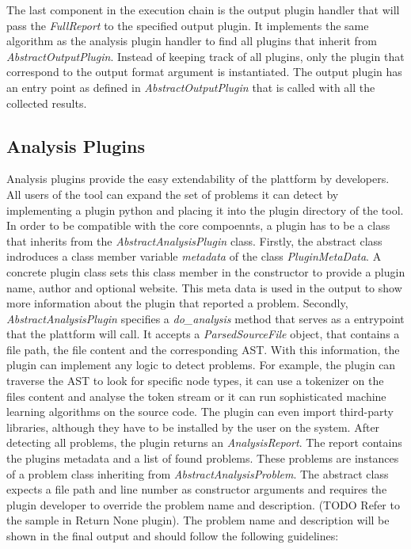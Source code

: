 The last component in the execution chain is the output plugin handler that will pass the \textit{FullReport} to the specified output plugin. It implements the same algorithm as the analysis plugin handler to find all plugins that inherit from \textit{AbstractOutputPlugin}. Instead of keeping track of all plugins, only the plugin that correspond to the output format argument is instantiated. The output plugin has an entry point as defined in \textit{AbstractOutputPlugin}  that is called with all the collected results.

\subsection{Analysis Plugins}
Analysis plugins provide the easy extendability of the plattform by developers. All users of the tool can expand the set of problems it can detect by implementing a plugin python and placing it into the plugin directory of the tool. In order to be compatible with the core compoennts, a plugin has to be a class that inherits from the \textit{AbstractAnalysisPlugin} class. Firstly, the abstract class indroduces a class member variable \textit{metadata} of the class \textit{PluginMetaData}. A concrete plugin class sets this class member in the constructor to provide a plugin name, author and optional website. This meta data is used in the output to show more information about the plugin that reported a problem. Secondly, \textit{AbstractAnalysisPlugin} specifies a \textit{do\_analysis} method that serves as a entrypoint that the plattform will call. It accepts a \textit{ParsedSourceFile} object, that contains a file path, the file content and the corresponding AST. With this information, the plugin can implement any logic to detect problems. 
For example, the plugin can traverse the AST to look for specific node types, it can use a tokenizer on the files content and analyse the token stream or it can run sophisticated machine learning algorithms on the source code.
The plugin can even import third-party libraries, although they have to be installed by the user on the system. After detecting all problems, the plugin returns an \textit{AnalysisReport}. The report contains the plugins metadata and a list of found problems. These problems are instances  of a problem class inheriting from \textit{AbstractAnalysisProblem}. The abstract class expects a file path and line number as constructor arguments and requires the plugin developer to override the problem name and description. (TODO Refer to the sample in Return None plugin). The problem name and description will be shown in the final output and should follow the following guidelines:
